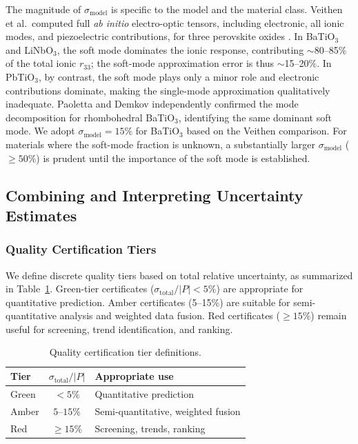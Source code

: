 \documentclass[prb,twocolumn,superscriptaddress,amsmath,amssymb,longbibliography]{revtex4-2}
\begin{document}
The magnitude of $\sigma_{\mathrm{model}}$ is specific to the model and 
the material class. Veithen et al.\ computed full \emph{ab initio} 
electro-optic tensors, including electronic, all ionic modes, and 
piezoelectric contributions, for three perovskite 
oxides \cite{Veithen2004_PRL,Veithen2005}. In BaTiO$_3$ and LiNbO$_3$, 
the soft mode dominates the ionic response, contributing $\sim$80--85\% of 
the total ionic $r_{33}$; the soft-mode approximation error is thus 
$\sim$15--20\%. In PbTiO$_3$, by contrast, the soft mode plays only a 
minor role and electronic contributions dominate, making the single-mode 
approximation qualitatively inadequate. Paoletta and 
Demkov \cite{Paoletta2021} independently confirmed the mode decomposition 
for rhombohedral BaTiO$_3$, identifying the same dominant soft mode. 
We adopt $\sigma_{\mathrm{model}} = 15\%$ for BaTiO$_3$ based on the 
Veithen comparison. For materials where the soft-mode 
fraction is unknown, a substantially larger $\sigma_{\mathrm{model}}$ 
($\geq 50\%$) is prudent until the importance of the soft mode is established.

\subsection{Combining and Interpreting Uncertainty Estimates}
\label{sec:interpretation}

\subsubsection{Quality Certification Tiers}
\label{sec:tiers}

We define discrete quality tiers based on total relative uncertainty, as 
summarized in Table~\ref{tab:tiers}. Green-tier certificates 
($\sigma_{\mathrm{total}}/|P| < 5\%$) are appropriate for quantitative 
prediction. Amber certificates (5--15\%) are suitable for semi-quantitative 
analysis and weighted data fusion. Red certificates ($\geq 15\%$) remain 
useful for screening, trend identification, and ranking.

\begin{table}
\caption{Quality certification tier definitions.}
\label{tab:tiers}
\begin{tabular}{lcl}
\toprule
Tier & $\sigma_{\mathrm{total}}/|P|$ & Appropriate use \\
\midrule
Green & $< 5\%$ & Quantitative prediction \\
Amber & $5$--$15\%$ & Semi-quantitative, weighted fusion \\
Red & $\geq 15\%$ & Screening, trends, ranking \\
\bottomrule
\end{tabular}
\end{table}
\end{document}
